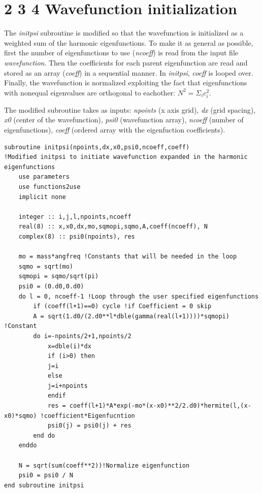 \documentclass{cis320}
\begin{document}
\section*{2 3 4 \quad Wavefunction initialization}
\setcounter{section}{4}
The \textit{initpsi} subroutine is modified so that the wavefunction is initialized as a weighted sum of the harmonic eigenfunctions. To make it as general as possible, first the number of eigenfunctions to use (\textit{ncoeff}) is read from the input file \textit{wavefunction}. Then the coefficients for each parent eigenfunction are read and stored as an array (\textit{coeff}) in a sequential manner. In \textit{initpsi}, \textit{coeff} is looped over. Finally, the wavefunction is normalized exploiting the fact that eigenfunctions with nonequal eigenvalues are orthogonal to eachother: $N^2 = \Sigma_i c_i^2$.\\
\par
The modified subroutine takes as inputs: \textit{npoints} (x axis grid), \textit{dx} (grid spacing), \textit{x0} (center of the wavefunction), \textit{psi0} (wavefunction array), \textit{ncoeff} (number of eigenfunctions), \textit{coeff} (ordered array with the eigenfuction coefficients).

    \begin{lstlisting}[caption=Modified \textit{initpsi} subroutine]
subroutine initpsi(npoints,dx,x0,psi0,ncoeff,coeff)      
!Modified initpsi to initiate wavefunction expanded in the harmonic eigenfunctions
    use parameters
    use functions2use
    implicit none
    
    integer :: i,j,l,npoints,ncoeff
    real(8) :: x,x0,dx,mo,sqmopi,sqmo,A,coeff(ncoeff), N
    complex(8) :: psi0(npoints), res
    
    mo = mass*angfreq !Constants that will be needed in the loop
    sqmo = sqrt(mo) 
    sqmopi = sqmo/sqrt(pi)
    psi0 = (0.d0,0.d0) 
    do l = 0, ncoeff-1 !Loop through the user specified eigenfunctions
        if (coeff(l+1)==0) cycle !if Coefficient = 0 skip
        A = sqrt(1.d0/(2.d0**l*dble(gamma(real(l+1))))*sqmopi) !Constant
        do i=-npoints/2+1,npoints/2
            x=dble(i)*dx
            if (i>0) then
            j=i
            else     
            j=i+npoints
            endif
            res = coeff(l+1)*A*exp(-mo*(x-x0)**2/2.d0)*hermite(l,(x-x0)*sqmo) !coefficient*Eigenfucntion
            psi0(j) = psi0(j) + res
        end do
    enddo
    
    N = sqrt(sum(coeff**2))!Normalize eigenfunction
    psi0 = psi0 / N 
end subroutine initpsi\end{lstlisting}
\end{document}

